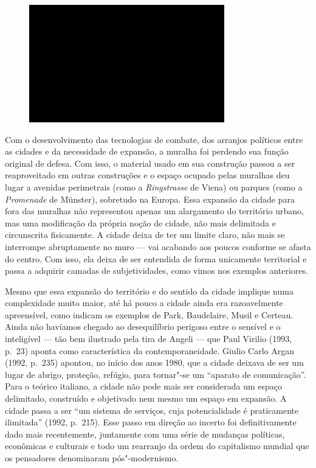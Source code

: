 \begin{figure}[!ht]

\centering
 \includegraphics[width=85mm]{./imgs/im1.jpg}
\caption{\tiny{}}

\end{figure}

Com o desenvolvimento das tecnologias de combate, dos arranjos políticos
entre as cidades e da necessidade de expansão, a muralha foi perdendo
sua função original de defesa. Com isso, o material usado em sua
construção passou a ser reaproveitado em outras construções e o espaço
ocupado pelas muralhas deu lugar a avenidas perimetrais (como a
\emph{Ringstrasse} de Viena) ou parques (como a \emph{Promenade} de
Münster), sobretudo na Europa. Essa expansão da cidade para fora das
muralhas não representou apenas um alargamento do território urbano, mas
uma modificação da própria noção de cidade, não mais delimitada e
circunscrita fisicamente. A cidade deixa de ter um limite claro, não
mais se interrompe abruptamente no muro --- vai acabando aos poucos
conforme se afasta do centro. Com isso, ela deixa de ser entendida de
forma unicamente territorial e passa a adquirir camadas de subjetividades,
como vimos nos exemplos anteriores.

Mesmo que essa expansão do território e do sentido da cidade implique
numa complexidade muito maior, até há pouco a cidade ainda era
razoavelmente apreensível, como indicam os exemplos de Park, Baudelaire,
Musil e Certeau. Ainda não havíamos chegado ao desequilíbrio perigoso
entre o sensível e o inteligível --- tão bem ilustrado pela tira de
Angeli --- que Paul Virilio (1993, p.~23) aponta como característica da
contemporaneidade. Giulio Carlo Argan (1992, p.~235) apontou, no início
dos anos 1980, que a cidade deixava de ser um lugar de abrigo, proteção,
refúgio, para tornar"-se um ``aparato de comunicação''. Para o teórico
italiano, a cidade não pode mais ser considerada um espaço delimitado,
construído e objetivado nem mesmo um espaço em expansão. A cidade passa
a ser ``um sistema de serviços, cuja potencialidade é praticamente
ilimitada'' (1992, p.~215). Esse passo em direção ao incerto foi
definitivamente dado mais recentemente, juntamente com uma série de
mudanças políticas, econômicas e culturais e todo um rearranjo da ordem
do capitalismo mundial que os pensadores denominaram pós"-modernismo.

